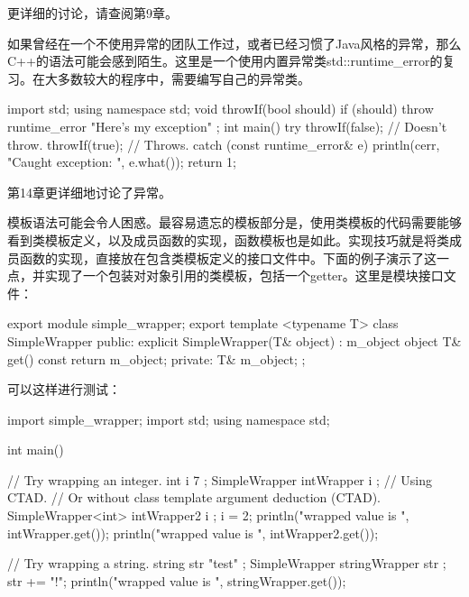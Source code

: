 更详细的讨论，请查阅第9章。


如果曾经在一个不使用异常的团队工作过，或者已经习惯了Java风格的异常，那么C++的语法可能会感到陌生。这里是一个使用内置异常类std::runtime\_error的复习。在大多数较大的程序中，需要编写自己的异常类。

\begin{cpp}
import std;
using namespace std;
void throwIf(bool should)
{
    if (should) {
        throw runtime_error { "Here's my exception" };
    }
}
int main()
{
    try {
        throwIf(false); // Doesn't throw.
        throwIf(true); // Throws.
    } catch (const runtime_error& e) {
        println(cerr, "Caught exception: {}", e.what());
        return 1;
    }
}
\end{cpp}

第14章更详细地讨论了异常。


模板语法可能会令人困惑。最容易遗忘的模板部分是，使用类模板的代码需要能够看到类模板定义，以及成员函数的实现，函数模板也是如此。实现技巧就是将类成员函数的实现，直接放在包含类模板定义的接口文件中。下面的例子演示了这一点，并实现了一个包装对对象引用的类模板，包括一个getter。这里是模块接口文件：

\begin{cpp}
export module simple_wrapper;
export template <typename T>
class SimpleWrapper
{
    public:
        explicit SimpleWrapper(T& object) : m_object { object } { }
        T& get() const { return m_object; }
    private:
        T& m_object;
};
\end{cpp}

可以这样进行测试：

\begin{cpp}
import simple_wrapper;
import std;
using namespace std;

int main()
{
    // Try wrapping an integer.
    int i { 7 };
    SimpleWrapper intWrapper { i }; // Using CTAD.
    // Or without class template argument deduction (CTAD).
    SimpleWrapper<int> intWrapper2 { i };
    i = 2;
    println("wrapped value is {}", intWrapper.get());
    println("wrapped value is {}", intWrapper2.get());

    // Try wrapping a string.
    string str { "test" };
    SimpleWrapper stringWrapper { str };
    str += "!";
    println("wrapped value is {}", stringWrapper.get());
}
\end{cpp}

